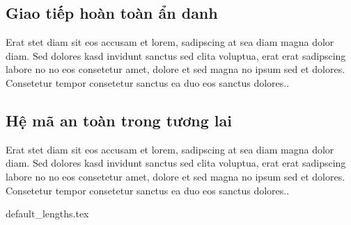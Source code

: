 \documentclass[class=report, crop=false]{standalone}
\begin{document}
		\subsection{Giao tiếp hoàn toàn ẩn danh}
			Erat stet diam sit eos accusam et lorem, sadipscing at sea diam magna dolor diam. Sed dolores kasd invidunt sanctus sed clita voluptua, erat erat sadipscing labore no no eos consetetur amet, dolore et sed magna no ipsum sed et dolores. Consetetur tempor consetetur sanctus ea duo eos sanctus dolores..
		\subsection{Hệ mã an toàn trong tương lai}
			Erat stet diam sit eos accusam et lorem, sadipscing at sea diam magna dolor diam. Sed dolores kasd invidunt sanctus sed clita voluptua, erat erat sadipscing labore no no eos consetetur amet, dolore et sed magna no ipsum sed et dolores. Consetetur tempor consetetur sanctus ea duo eos sanctus dolores..
			
			
			
			
	

	\newpage
	{default_lengths.tex}
\end{document}

